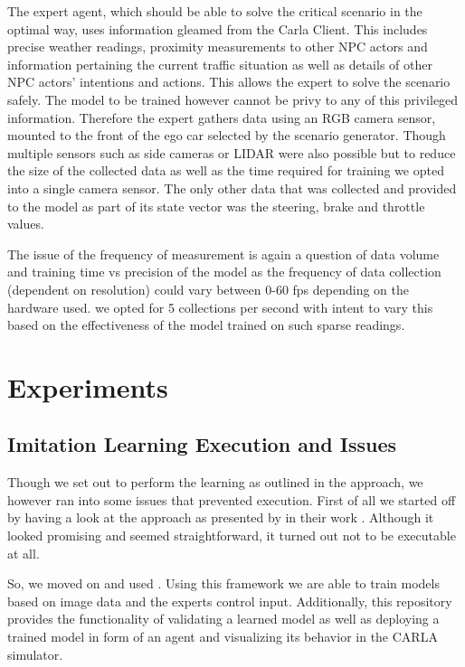 \documentclass[conference, a4paper, 11pt]{IEEEtran}
\begin{document}
The expert agent, which should be able to solve the critical scenario in the optimal way, uses information gleamed from the Carla Client. This includes precise weather readings, proximity measurements to other NPC actors and information pertaining the current traffic situation as well as details of other NPC actors' intentions and actions. This allows the expert to solve the scenario safely. The model to be trained however cannot be privy to any of this privileged information. Therefore the expert gathers data using an RGB camera sensor, mounted to the front of the ego car selected by the scenario generator. Though multiple sensors such as side cameras or LIDAR were also possible but to reduce the size of the collected data as well as the time required for training we opted into a single camera sensor. The only other data that was collected and provided to the model as part of its state vector was the steering, brake and throttle values.

The issue of the frequency of measurement is again a question of data volume and training time vs precision of the model as the frequency of data collection (dependent on resolution) could vary between 0-60 fps depending on the hardware used. we opted for 5 collections per second with intent to vary this based on the effectiveness of the model trained on such sparse readings.

\section{Experiments}
\subsection{Imitation Learning Execution and Issues}
Though we set out to perform the learning as outlined in the approach, we however ran into some issues that prevented execution. 
First of all we started off by having a look at the approach as presented by \citeauthor{Xiao2020ActionBasedRL} in their work  \cite{Xiao2020ActionBasedRL, ActionBasedRL:github}. Although it looked promising and seemed straightforward, it turned out not to be executable at all.

So, we moved on and used  \cite{Toromanoff_2020_CVPR}. Using this framework we are able to train models based on image data and the experts control input. Additionally, this repository provides the functionality of validating a learned model as well as deploying a trained model in form of an agent and visualizing its behavior in the CARLA simulator.
\end{document}

